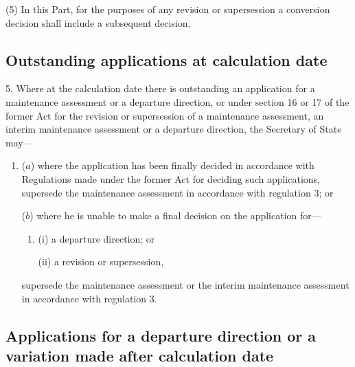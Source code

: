 \documentclass[12pt,a4paper]{article}
\begin{document}
(5) In this Part, for the purposes of any revision or supersession a conversion decision shall include a subsequent decision.


\subsection[5. Outstanding applications at calculation date]{Outstanding applications at calculation date}

5.  Where at the calculation date there is outstanding an application for a maintenance assessment or a departure direction, or under section 16 or 17 of the former Act for the revision or supersession of a maintenance assessment, an interim maintenance assessment or a departure direction, the Secretary of State may—
\begin{enumerate}\item[]
($a$) where the application has been finally decided in accordance with Regulations made under the former Act for deciding such applications, supersede the maintenance assessment in accordance with regulation 3; or

($b$) where he is unable to make a final decision on the application for—
\begin{enumerate}\item[]
(i) a departure direction; or

(ii) a revision or supersession,
\end{enumerate}
supersede the maintenance assessment or the interim maintenance assessment in accordance with regulation 3.
\end{enumerate}

\subsection[6. Applications for a departure direction or a variation made after calculation date]{Applications for a departure direction or a variation made after calculation date}
\end{document}
